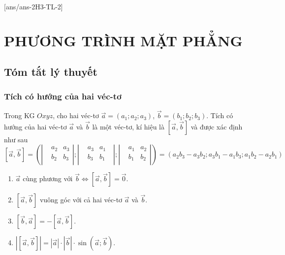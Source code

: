 [ans/ans-2H3-TL-2]
\setcounter{dang}{0}
\setcounter{vd}{0}
\section{PHƯƠNG TRÌNH MẶT PHẲNG}
\subsection{Tóm tắt lý thuyết}
\begin{tomtat}
	\subsubsection{Tích có hướng của hai véc-tơ }
	\begin{dn}
		Trong KG $Oxyz$, cho hai véc-tơ $\vec{a}=(a_1;a_2;a_3 )$, $\vec{b}=(b_1;b_2;b_3 )$. Tích có hướng của hai véc-tơ $\vec{a}$ và $\vec{b}$ là một véc-tơ, kí hiệu là $\left[ \vec{a},\vec{b} \right]$ và được xác định như sau
		$$\left[ \overrightarrow{a},\overrightarrow{b} \right]=\left( \left| \begin{aligned}
		& a_2&a_3 \\
		& b_2&b_3 \\
		\end{aligned} \right|;\left| \begin{aligned}
		& a_3&a_1\text{ } \\
		& b_3&b_1 \\
		\end{aligned} \right|;\left| \begin{aligned}
		& a_1&a_2 \\
		& b_1&b_2 \\
		\end{aligned} \right| \right)=\left( a_2b_3-a_3b_2;a_3b_1-a_1b_3;a_1b_2-a_2b_1 \right)$$
		
	\end{dn}
	\begin{tc}
		\begin{enumerate}
			\item $\vec{a}$ cùng phương với $\vec{b}$$\Leftrightarrow \left[ \vec{a},\vec{b} \right]=\vec{0}$.
			\item $\left[ \vec{a},\vec{b} \right]$ vuông góc với cả hai véc-tơ $\vec{a}$ và $\vec{b}$.
			\item $\left[ \vec{b},\vec{a} \right]=-\left[ \vec{a},\vec{b} \right]$.
			\item $\left| \left[ \vec{a},\vec{b} \right] \right|=\left| \vec{a} \right|\cdot \left| \vec{b} \right|\cdot \sin (\vec{a};\vec{b} )$.
		\end{enumerate}
	\end{tc}

\end{tomtat}
